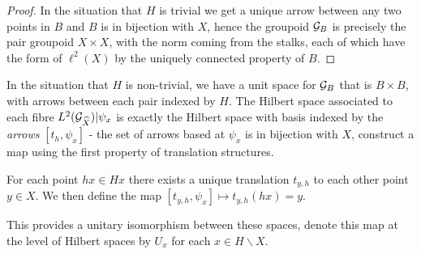 \begin{corollary}
\begin{proof}
In the situation that $H$ is trivial we get a unique arrow between any two points in $B$ and $B$ is in bijection with $X$, hence the groupoid $\mathcal{G}_{B}$ is precisely the pair groupoid $X \times X$, with the norm coming from the stalks, each of which have the form of $\ell^{2}(X)$ by the uniquely connected property of $B$.
\end{proof}

\begin{remark}
In the situation that $H$ is non-trivial, we have a unit space for $\mathcal{G}_{B}$ that is $B\times B$, with arrows between each pair indexed by $H$. The Hilbert space associated to each fibre $L^{2}(\mathcal{G}_{\widehat{X}})|\psi_{x}$ is exactly the Hilbert space with basis indexed by the \textit{arrows} $[t_{h},\psi_{x}]$ - the set of arrows based at $\psi_{x}$ is in bijection with $X$, construct a map using the first property of translation structures.

For each point $hx \in Hx$ there exists a unique translation $t_{y,h}$ to each other point $y \in X$. We then define the map $[t_{y,h}, \psi_{x}] \mapsto t_{y,h}(hx)=y$.

This provides a unitary isomorphism between these spaces, denote this map at the level of Hilbert spaces by $U_{x}$ for each $x \in H \backslash X$.
\end{remark}

\end{corollary}
